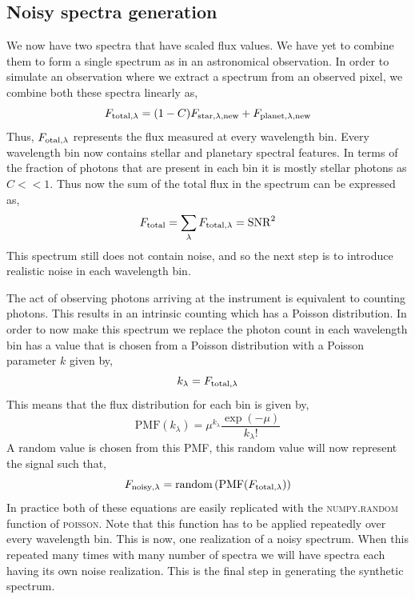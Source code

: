 \subsection{Noisy spectra generation}
We now have two spectra that have scaled flux values. 
We have yet to combine them to form a single spectrum as in an astronomical observation.
In order to simulate an observation where we extract a spectrum from an observed pixel, we combine both these spectra linearly as,
 \begin{equation}
     F_{\rm{total},\lambda}=(1-C)F_{\rm{star},\lambda,new} + F_{\rm{planet},\lambda,new}
     \label{eq:insertion}
 \end{equation}
Thus, $F_{\rm{otal,\lambda}}$ represents the flux measured at every wavelength bin.
Every wavelength bin now contains stellar and planetary spectral features. 
In terms of the fraction of photons that are present in each bin it is mostly stellar photons as $C<<1$.
Thus now the sum of the total flux in the spectrum can be expressed as,
\begin{equation}
F_{\rm{total}}=\sum\limits_{\lambda}F_{\rm{total,\lambda}}=\rm{SNR}^2 
\label{eq: true signal}
\end{equation}
 This spectrum still does not contain noise, and so the next step is to introduce realistic noise in each wavelength bin. 
 
The act of observing photons arriving at the instrument is equivalent to counting photons.
This results in an intrinsic counting which has a Poisson distribution.
In order to now make this spectrum we replace the photon count in each wavelength bin has a value that is chosen from a Poisson distribution with a Poisson parameter $k$ given by,
 \begin{equation}
     k_\lambda = F_{\rm{total},\lambda}
     \label{eq:noise}
 \end{equation}
This means that the flux distribution for each bin is given by,
 \begin{equation}
    \textrm{PMF}(k_\lambda) = \mu^{k_\lambda}\dfrac{\exp(-\mu)}{k_\lambda!} 
    \label{eq: poisson}
 \end{equation}
A random value is chosen from this PMF, this random value will now represent the signal such that,
 \begin{equation}
     F_{\rm{noisy,\lambda}} = \textrm{random}\left(\textrm{PMF}(F_{\rm{total,\lambda}})\right)
 \end{equation}
In practice both of these equations are easily replicated with the \textsc{numpy.random} function of \textsc{poisson}.
Note that this function has to be applied repeatedly over every wavelength bin.
This is now, one realization of a noisy spectrum.
When this repeated many times with many number of spectra we will have spectra each having its own noise realization. 
This is the final step in generating the synthetic spectrum.

